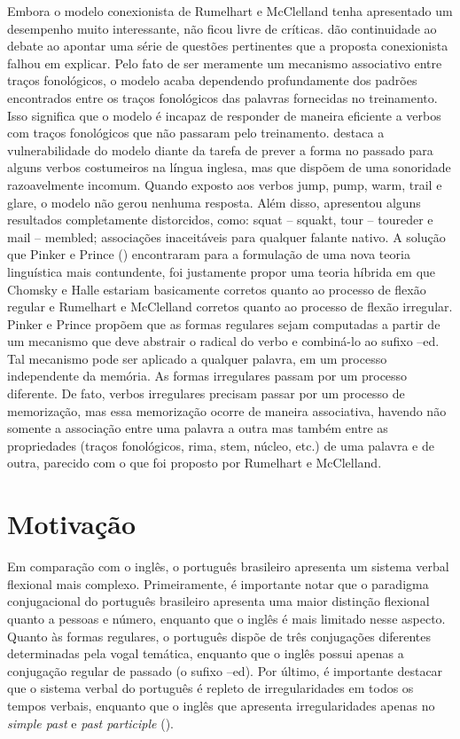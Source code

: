 Embora o modelo conexionista de Rumelhart e McClelland tenha apresentado um desempenho muito interessante, não ficou livre de críticas. \cite{Pinker:1988} dão continuidade ao debate ao apontar uma série de questões pertinentes que a proposta conexionista falhou em explicar.  Pelo fato de ser meramente um mecanismo associativo entre traços fonológicos, o modelo acaba dependendo profundamente dos padrões encontrados entre os traços fonológicos das palavras fornecidas no treinamento. Isso significa que o modelo é incapaz de responder de maneira eficiente a verbos com traços fonológicos que não passaram pelo treinamento. \cite{Pinker:1999} destaca a vulnerabilidade do modelo diante da tarefa de prever a forma no passado para alguns verbos costumeiros na língua inglesa, mas que dispõem de uma sonoridade razoavelmente incomum. Quando exposto aos verbos jump, pump, warm,  trail e glare, o modelo não gerou nenhuma resposta. Além disso, apresentou alguns resultados completamente distorcidos, como: squat – squakt, tour – toureder e mail – membled; associações inaceitáveis para qualquer falante nativo. A solução que Pinker e Prince (\citeyear{Pinker:1988}) encontraram para a formulação de uma nova teoria linguística mais contundente, foi justamente propor uma teoria híbrida em que Chomsky e Halle estariam basicamente corretos quanto ao processo de flexão regular e Rumelhart e McClelland corretos quanto ao processo de flexão irregular. Pinker e Prince propõem que as formas regulares sejam computadas a partir de um mecanismo que deve abstrair o radical do verbo e combiná-lo ao sufixo –ed.  Tal mecanismo pode ser aplicado a qualquer palavra, em um processo independente da memória. As formas irregulares passam por um processo diferente. De fato, verbos irregulares precisam passar por um processo de memorização, mas essa memorização ocorre de maneira associativa, havendo não somente a associação entre uma palavra a outra mas também entre as propriedades (traços fonológicos, rima, stem, núcleo, etc.) de uma palavra e de outra, parecido com o que foi proposto por Rumelhart e McClelland.
\section{Motivação}
\label{sec:motivation}

Em comparação com o inglês, o português brasileiro apresenta um sistema verbal flexional mais complexo. Primeiramente, é importante notar que o paradigma conjugacional do português brasileiro apresenta uma maior distinção flexional quanto a pessoas e número, enquanto que o inglês é mais limitado nesse aspecto. Quanto às formas regulares, o português dispõe de três conjugações diferentes determinadas pela vogal temática, enquanto que o inglês possui apenas a conjugação regular de passado (o sufixo –ed). Por último, é importante destacar que o sistema verbal do português é repleto de irregularidades em todos os tempos verbais, enquanto que o inglês que apresenta irregularidades apenas no \textit{simple past} e \textit{past participle} (\cite{wuerges:2014}).

